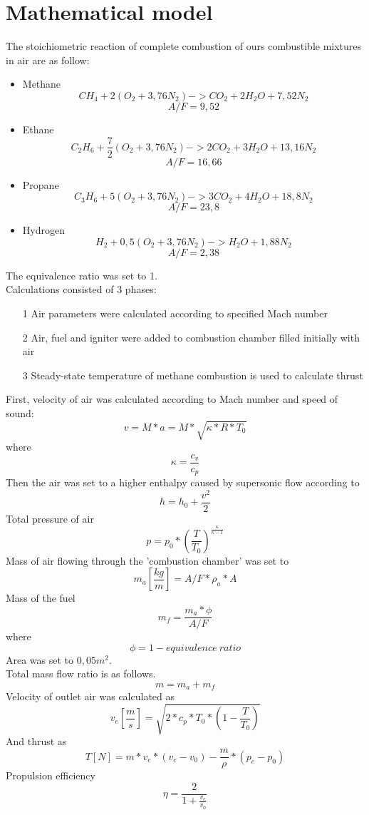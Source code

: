 \documentclass[a4paper,11pt]{article}
\begin{document}
\section{Mathematical model}
The stoichiometric reaction of complete combustion of ours combustible mixtures in air are as follow:
\begin{itemize}
\item Methane\\
$$CH_4+2(O_2+3,76N_2) ->CO_2+2H_2O+7,52N_2$$
$$A/F=9,52$$
\item Ethane\\
$$C_2H_6+\frac{7}{2}(O_2+3,76N_2)->2CO_2+3H_2O+13,16N_2$$
$$A/F=16,66$$
\item Propane\\
$$C_3H_6+5(O_2+3,76N_2)->3CO_2+4H_2O+18,8N_2$$
$$A/F=23,8$$
\item Hydrogen\\
$$H_2+0,5(O_2+3,76N_2)->H_2O+1,88N_2$$
$$A/F=2,38$$
\end{itemize}

The equivalence ratio was set to 1.\\


Calculations consisted of 3 phases: 
\begin{enumerate}
\item[1]Air parameters were calculated according to specified Mach number 
\item[2]Air, fuel and igniter were added to combustion chamber filled initially with air 
\item[3]Steady-state temperature of methane combustion is used to calculate thrust
\end{enumerate}
First,  velocity of air was calculated according to Mach number and speed of sound:
$$v=M*a=M*\sqrt{\kappa*R*T_0}$$
where 
$$\kappa=\frac{c_v}{c_p}$$
Then the air was set to a higher enthalpy caused by supersonic flow according to $$h=h_0+\frac{v^2}{2}$$
Total pressure of air 
$$p=p_0*{\left(\frac{T}{T_0}\right)}^{\frac{\kappa}{\kappa-1}}$$
Mass of air flowing through the ’combustion chamber’ was set to 
$$m_a\left[\frac{kg}{m}\right]=A/F*\rho_a*A$$
Mass of the fuel
$$m_f=\frac{m_a*\phi}{A/F}$$
where $$\phi=1-equivalence\ ratio $$
Area was set to $0,05 m^2$.
\\
Total mass flow ratio is as follows.
$$m=m_a+m_f$$
Velocity of outlet air was calculated as 
$$v_e\left[\frac{m}{s}\right]=\sqrt{2*c_p*T_0*\left(1-\frac{T}{T_0}\right)}$$
And thrust as
$$T\left[N\right]=m*v_e*(v_e-v_0)-\frac{m}{\rho}*(p_e-p_0)$$
Propulsion efficiency
$$\eta=\frac{2}{1+\frac{v_e}{v_0}}$$
\end{document}

